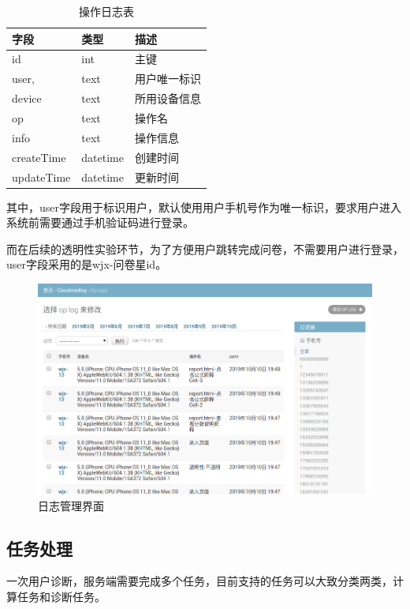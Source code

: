 \begin{table}[]
    \centering
    \begin{tabular}{lll}
        \toprule
        字段 & 类型 & 描述 \\ 
        \midrule
        id & int & 主键 \\
        user, & text & 用户唯一标识 \\ 
        device & text & 所用设备信息 \\
        op & text & 操作名 \\
        info & text & 操作信息 \\
        createTime & datetime & 创建时间 \\
        updateTime & datetime & 更新时间\\
        \bottomrule
    \end{tabular}
    \caption{操作日志表}
    \label{tab:op_log}
\end{table}


其中，user字段用于标识用户，默认使用用户手机号作为唯一标识，要求用户进入系统前需要通过手机验证码进行登录。

而在后续的透明性实验环节，为了方便用户跳转完成问卷，不需要用户进行登录，user字段采用的是wjx-问卷星id。

\begin{figure}[ht]
    \centering
    \includegraphics[width=15cm]{images/op_log.png}
    \caption{日志管理界面}
    \label{fig:op_log}
\end{figure}

\subsection{任务处理}
一次用户诊断，服务端需要完成多个任务，目前支持的任务可以大致分类两类，计算任务和诊断任务。


